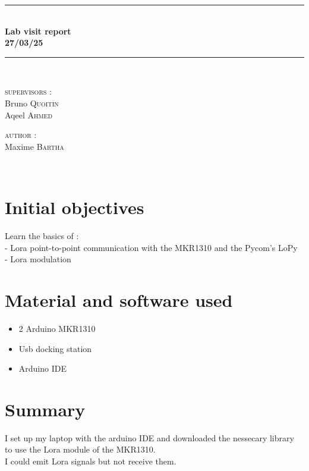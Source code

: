 \documentclass[a4paper, 12pt]{article}
\newcommand{\HRule}{\rule{\linewidth}{0.3mm}}
\begin{document}
\begin{center}
\HRule \\[0.3cm]
{ \LARGE \bfseries Lab visit report \\[0.3cm]}
{ \LARGE \bfseries 27/03/25 \\[0.1cm]} %
\HRule \\[1.5cm]

\begin{minipage}[t]{0.45\textwidth}
\begin{flushleft} \large
\textsc{supervisors :}\\
Bruno \textsc{Quoitin}\\
Aqeel \textsc{Ahmed}\\
\end{flushleft}

\end{minipage}
\begin{minipage}[t]{0.45\textwidth}
\begin{flushright} \large
\textsc{author :}\\
Maxime \textsc{Bartha}\\
\end{flushright}
\end{minipage}\\[2ex]
\end{center}


\section{Initial objectives}
Learn the basics of :\\
- Lora point-to-point communication with the MKR1310 and the Pycom's LoPy\\
- Lora modulation 

\section{Material and software used}
\begin{itemize}
  \item 2 Arduino MKR1310
  \item Usb docking station
  \item Arduino IDE
\end{itemize}

\section{Summary}
I set up my laptop with the arduino IDE and downloaded the nessecary library to use the Lora module of the MKR1310.\\
I could emit Lora signals but not receive them.
\end{document}

